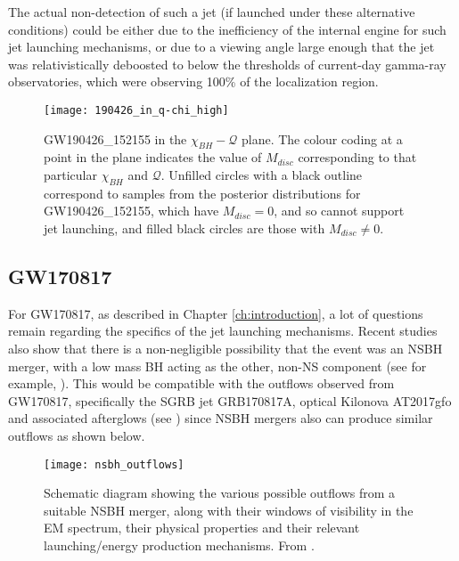         The actual non-detection of such a jet (if launched under these alternative
        conditions) could be either due to the inefficiency of the internal engine for
        such jet launching mechanisms, or due to a viewing angle large
        enough that the jet was relativistically deboosted to below the thresholds of
        current-day gamma-ray observatories, which were observing 100\% of the
        localization region.

        \begin{figure}[H]
            \centering
            \texttt{[image: 190426\_in\_q-chi\_high]}
            \caption[GW190426 in the $\chi_{BH}-\mathcal{Q}$ plane]
            {
                GW190426\_152155 in the $\chi_{BH}-\mathcal{Q}$ plane. The colour coding
                at a point in the plane indicates the value of $M_{disc}$ corresponding
                to that particular $\chi_{BH}$ and $\mathcal{Q}$.  Unfilled circles with
                a black outline correspond to samples from the posterior distributions
                for GW190426\_152155, which have $M_{disc} = 0$, and so cannot support
                jet launching, and filled black circles are those with $M_{disc} \neq
                0$.
            }
            \label{fig:mdisc_q_190426}
        \end{figure}

    \subsection{GW170817}

        For GW170817, as described in Chapter \ref{ch:introduction}, a lot of questions
        remain regarding the specifics of the jet launching mechanisms. Recent studies
        also show that there is a non-negligible possibility that the event was an NSBH
        merger, with a low mass BH acting as the other, non-NS component (see for
        example, \cite{hinderer_2019}). This would be compatible with the outflows
        observed from GW170817, specifically the SGRB jet GRB170817A, optical Kilonova
        AT2017gfo and associated afterglows (see \cite{abbott_2017}) since NSBH mergers
        also can produce similar outflows as shown below.

        \begin{figure}[H]
            \centering
            \texttt{[image: nsbh\_outflows]}
            \caption[EM outflows from NSBH mergers, from \cite{barbieri_2019a}]
            {
                Schematic diagram showing the various possible outflows from a suitable
                NSBH merger, along with their windows of visibility in the EM spectrum,
                their physical properties and their relevant launching/energy production
                mechanisms. From \cite{barbieri_2019a}.
            }
            \label{fig:nsbh_outflows}
        \end{figure}

